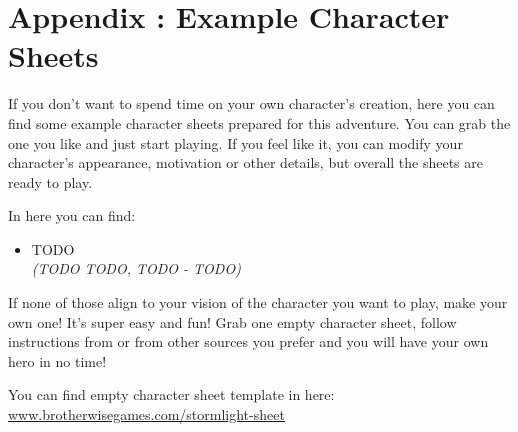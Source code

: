 \chapter{Appendix \thechapter{}: Example Character Sheets}
\label{chap:exampleSheets}

If you don't want to spend time on your own character's creation, here you can find some example character sheets prepared for this adventure. You can grab the one you like and just start playing. If you feel like it, you can modify your character's appearance, motivation or other details, but overall the sheets are ready to play.

In here you can find:
\begin{itemize}
	\item TODO 				\\ \textit{(TODO TODO, TODO - TODO)}
\end{itemize}
\newpage 

If none of those align to your vision of the character you want to play, make your own one! It's super easy and fun! Grab one empty character sheet, follow instructions from \handbook{} or from other sources you prefer and you will have your own hero in no time!

You can find empty character sheet template in here: \\

\href{https://www.brotherwisegames.com/stormlight-sheet}{www.brotherwisegames.com/stormlight-sheet}
\newpage



